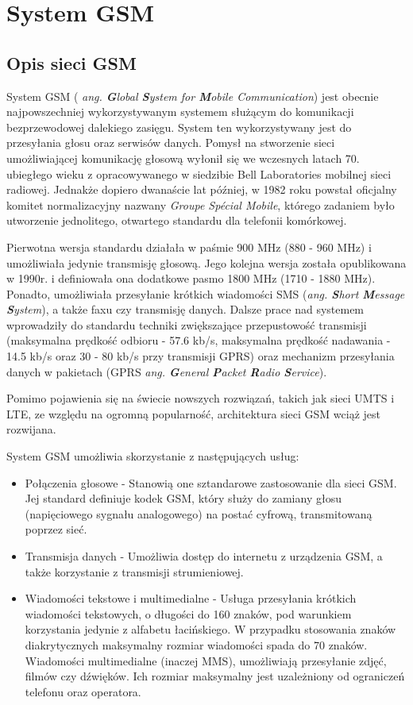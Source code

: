 \section{System GSM}
\label{GSM}

\subsection{Opis sieci GSM}

System GSM (\textit{ ang. \textbf{G}lobal \textbf{S}ystem for \textbf{M}obile Communication}) jest obecnie najpowszechniej wykorzystywanym systemem służącym do komunikacji bezprzewodowej dalekiego zasięgu. System ten wykorzystywany jest do przesyłania głosu oraz serwisów danych. Pomysł na stworzenie sieci umożliwiającej komunikację głosową wyłonił się we wczesnych latach 70. ubiegłego wieku z opracowywanego w siedzibie Bell Laboratories mobilnej sieci radiowej. Jednakże dopiero dwanaście lat później, w 1982 roku powstał oficjalny komitet normalizacyjny nazwany \textit{Groupe Spécial Mobile}, którego zadaniem było utworzenie jednolitego, otwartego standardu dla telefonii komórkowej. 

Pierwotna wersja standardu działała w paśmie 900 MHz (880 - 960 MHz) i umożliwiała jedynie transmisję głosową. Jego kolejna wersja została opublikowana w 1990r. i definiowała ona dodatkowe pasmo 1800 MHz (1710 - 1880 MHz). Ponadto, umożliwiała przesyłanie krótkich wiadomości SMS (\textit{ang. \textbf{S}hort \textbf{M}essage \textbf{S}ystem}), a także faxu czy transmisję danych. Dalsze prace nad systemem wprowadziły do standardu techniki zwiększające przepustowość transmisji (maksymalna prędkość odbioru - 57.6 kb/s, maksymalna prędkość nadawania - 14.5 kb/s oraz 30 - 80 kb/s przy transmisji GPRS) oraz mechanizm przesyłania danych w pakietach (GPRS \textit{ang. \textbf{G}eneral \textbf{P}acket \textbf{R}adio \textbf{S}ervice}). 

Pomimo pojawienia się na świecie nowszych rozwiązań, takich jak sieci UMTS i LTE, ze względu na ogromną popularność, architektura sieci GSM wciąż jest rozwijana. 


System GSM umożliwia skorzystanie z następujących usług:
\begin{itemize}
	\item Połączenia głosowe - Stanowią one sztandarowe zastosowanie dla sieci GSM. Jej standard definiuje kodek GSM, który służy do zamiany głosu (napięciowego sygnału analogowego) na postać cyfrową, transmitowaną poprzez sieć.
	\item Transmisja danych - Umożliwia dostęp do internetu z urządzenia GSM, a także korzystanie z transmisji strumieniowej.
	\item Wiadomości tekstowe i multimedialne - Usługa przesyłania krótkich wiadomości tekstowych, o długości do 160 znaków, pod warunkiem korzystania jedynie z alfabetu łacińskiego. W przypadku stosowania znaków diakrytycznych maksymalny rozmiar wiadomości spada do 70 znaków. Wiadomości multimedialne (inaczej MMS), umożliwiają przesyłanie zdjęć, filmów czy dźwięków. Ich rozmiar maksymalny jest uzależniony od ograniczeń telefonu oraz operatora.
\end{itemize}

